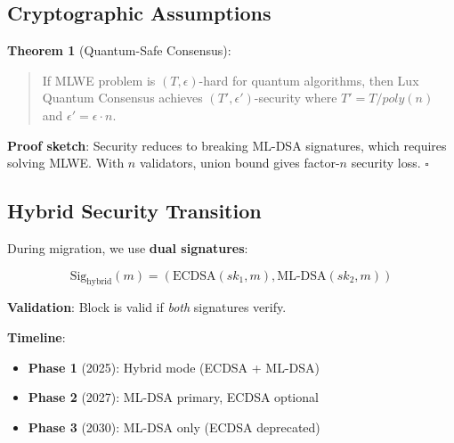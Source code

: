 \subsection{Cryptographic Assumptions}

\textbf{Theorem 1} (Quantum-Safe Consensus):
\begin{quote}
If MLWE problem is $(T, \epsilon)$-hard for quantum algorithms, then Lux Quantum Consensus achieves $(T', \epsilon')$-security where $T' = T / poly(n)$ and $\epsilon' = \epsilon \cdot n$.
\end{quote}

\textbf{Proof sketch}: Security reduces to breaking ML-DSA signatures, which requires solving MLWE. With $n$ validators, union bound gives factor-$n$ security loss. $\square$

\subsection{Hybrid Security Transition}

During migration, we use \textbf{dual signatures}:

\begin{equation}
\text{Sig}_{\text{hybrid}}(m) = (\text{ECDSA}(sk_1, m), \text{ML-DSA}(sk_2, m))
\end{equation}

\textbf{Validation}: Block is valid if \emph{both} signatures verify.

\textbf{Timeline}:
\begin{itemize}
    \item \textbf{Phase 1} (2025): Hybrid mode (ECDSA + ML-DSA)
    \item \textbf{Phase 2} (2027): ML-DSA primary, ECDSA optional
    \item \textbf{Phase 3} (2030): ML-DSA only (ECDSA deprecated)
\end{itemize}

